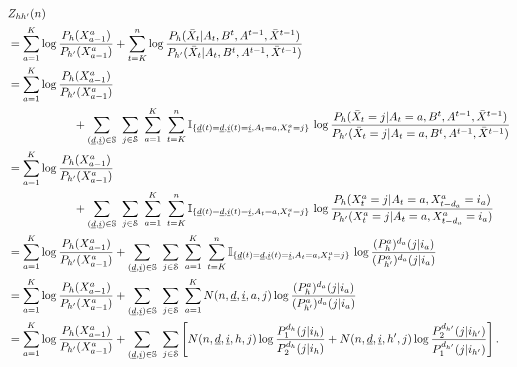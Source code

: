 \begin{align}
	&Z_{hh'}(n) \nonumber\\
	&=\sum\limits_{a=1}^{K}\log \frac{P_h(X_{a-1}^a)}{P_{h'}(X_{a-1}^a)} + \sum\limits_{t=K}^{n}\log\frac{P_h(\bar{X}_t|A_t,B^{t},A^{t-1},\bar{X}^{t-1})}{P_{h'}(\bar{X}_t|A_t,B^{t},A^{t-1},\bar{X}^{t-1})}\nonumber\\
	&=\sum\limits_{a=1}^{K}\log \frac{P_h(X_{a-1}^a)}{P_{h'}(X_{a-1}^a)} \nonumber\\
	&\hspace{2cm}+ \sum\limits_{(\underline{d},\underline{i})\in\mathbb{S}}~
\sum\limits_{j\in\mathcal{S}}~\sum\limits_{a=1}^{K}~\sum\limits_{t=K}^{n}\mathbb{I}_{\{\underline{d}(t)=\underline{d},\underline{i}(t)=\underline{i},A_t=a,X_t^a=j\}}\,\log \frac{P_h(\bar{X}_t=j|A_t=a,B^{t},A^{t-1},\bar{X}^{t-1})}{P_{h'}(\bar{X}_t=j|A_t=a,B^{t},A^{t-1},\bar{X}^{t-1})} \nonumber\\
    &= \sum\limits_{a=1}^{K}\log \frac{P_h(X_{a-1}^a)}{P_{h'}(X_{a-1}^a)} \nonumber\\
    &\hspace{2cm}+ \sum\limits_{(\underline{d},\underline{i})\in\mathbb{S}}~
    \sum\limits_{j\in\mathcal{S}}~\sum\limits_{a=1}^{K}~\sum\limits_{t=K}^{n}\mathbb{I}_{\{\underline{d}(t)=\underline{d},\underline{i}(t)=\underline{i},A_t=a,X_t^a=j\}}\,\log \frac{P_h(X_{t}^a=j|A_t=a,X_{t-d_a}^a=i_a)}{P_{h'}(X_{t}^a=j|A_t=a,X_{t-d_a}^a=i_a)} \nonumber\\
    &=\sum\limits_{a=1}^{K}\log \frac{P_h(X_{a-1}^a)}{P_{h'}(X_{a-1}^a)} + \sum\limits_{(\underline{d},\underline{i})\in\mathbb{S}}~
    \sum\limits_{j\in\mathcal{S}}~\sum\limits_{a=1}^{K}~\sum\limits_{t=K}^{n}\mathbb{I}_{\{\underline{d}(t)=\underline{d},\underline{i}(t)=\underline{i},A_t=a,X_t^a=j\}}\,\log \frac{(P_h^a)^{d_a}(j|i_a)}{(P_{h'}^a)^{d_a}(j|i_a)} \nonumber\\
   	&=\sum\limits_{a=1}^{K}\log \frac{P_h(X_{a-1}^a)}{P_{h'}(X_{a-1}^a)}+\sum\limits_{(\underline{d},\underline{i})\in\mathbb{S}}~
     \sum\limits_{j\in\mathcal{S}}~\sum\limits_{a=1}^{K} N(n,\underline{d},\underline{i},a,j)\log\frac{(P_h^a)^{d_a}(j|i_a)}{(P_{h'}^a)^{d_a}(j|i_a)}\label{restless_with_known_eq:Z_{hh'}(n)_temp_1}\\
     &=\sum\limits_{a=1}^{K}\log \frac{P_h(X_{a-1}^a)}{P_{h'}(X_{a-1}^a)}+\sum\limits_{(\underline{d},\underline{i})\in\mathbb{S}}~
     \sum\limits_{j\in\mathcal{S}}\left[N(n,\underline{d},\underline{i},h,j)\log\frac{P_1^{d_h}(j|i_h)}{P_2^{d_h}(j|i_h)}+N(n,\underline{d},\underline{i},h',j)\log\frac{P_2^{d_{h'}}(j|i_{h'})}{P_1^{d_{h'}}(j|i_{h'})}\right].\label{restless_with_known_eq:Z_{hh'}(n)}
\end{align}
